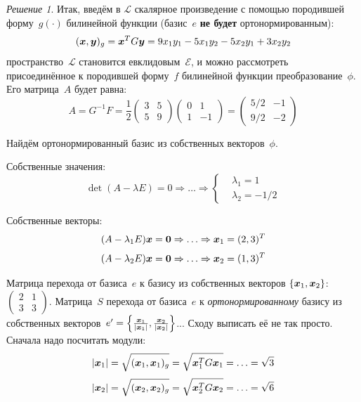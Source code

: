 \documentclass[a4paper,12pt]{article}
\theoremstyle{remark}
\newtheorem*{finalsolution}{Решение}
\begin{document}
\begin{finalsolution}
    Итак, введём в $\mathcal L$ скалярное произведение с помощью породившей форму~$g(\cdot)$ билинейной функции (базис~$e$ \textbf{не будет} ортонормированным):
    \[
      (\boldsymbol x, \boldsymbol y)_g = \boldsymbol x^T G \boldsymbol y = 9 x_1 y_1 - 5 x_1 y_2 - 5 x_2 y_1 + 3 x_2 y_2
    \]
    пространство~$\mathcal L$ становится евклидовым~$\mathcal E$, и можно рассмотреть присоединённое к породившей форму~$f$ билинейной функции преобразование~$\phi$.
    Его матрица~$A$ будет равна:
    \[
      A = G^{-1} F = \frac{1}{2} \begin{pmatrix}
        3 & 5\\
        5 & 9
      \end{pmatrix} \begin{pmatrix}
        0 & 1\\
        1 & -1
      \end{pmatrix} = \begin{pmatrix}
        5/2 & -1\\
        9/2 & -2
      \end{pmatrix}
    \]
    
    Найдём ортонормированный базис из собственных векторов~$\phi$.
    
    Собственные значения:
    \[
      \det (A - \lambda E) = 0 \Rightarrow \ldots \Rightarrow \left\{
        \begin{aligned}
          &\lambda_1 = 1\\
          &\lambda_2 = -1/2
        \end{aligned}
      \right.
    \]
    
    Собственные векторы:
    \[
      (A - \lambda_1 E) \boldsymbol x = \boldsymbol 0 \Rightarrow \ldots \Rightarrow \boldsymbol x_1 = (2, 3)^T
    \]
    \[
      (A - \lambda_2 E) \boldsymbol x = \boldsymbol 0 \Rightarrow \ldots \Rightarrow \boldsymbol x_2 = (1, 3)^T
    \]
    
    Матрица перехода от базиса~$e$ к базису из собственных векторов $\{\boldsymbol x_1, \boldsymbol x_2\}$: $\left(\begin{smallmatrix} 2 & 1 \\ 3 & 3\end{smallmatrix}\right)$.
    Матрица~$S$ перехода от базиса~$e$ к \emph{ортонормированному} базису из собственных векторов~$e' \hm= \left\{\frac{\bds x_1}{|\bds x_1|}, \frac{\bds x_2}{|\bds x_2|}\right\}$...
    Сходу выписать её не так просто.
    Сначала надо посчитать модули:
    \[
      |\boldsymbol x_1| = \sqrt{(\boldsymbol x_1, \boldsymbol x_1)_g} = \sqrt{\boldsymbol x_1^T G \boldsymbol x_1} = \ldots = \sqrt{3}
    \]
    \[
      |\boldsymbol x_2| = \sqrt{(\boldsymbol x_2, \boldsymbol x_2)_g} = \sqrt{\boldsymbol x_2^T G \boldsymbol x_2} = \ldots = \sqrt{6}
    \]
    

\end{finalsolution}
\end{document}
